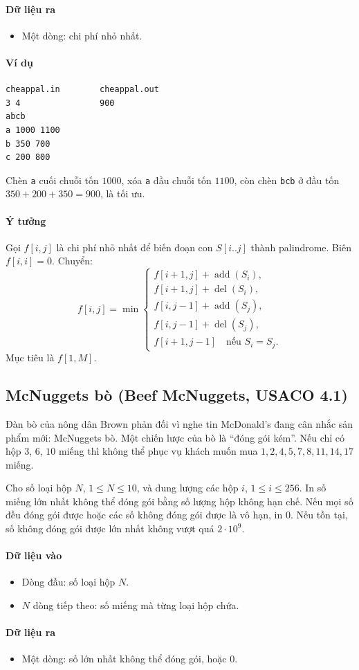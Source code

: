 \documentclass[11pt]{article}
\newcommand{\problem}[1]{\subsection{#1}}
\newcommand{\iosec}[1]{\paragraph{#1}}
\begin{document}
\iosec{Dữ liệu ra}
\begin{itemize}
  \item Một dòng: chi phí nhỏ nhất.
\end{itemize}

\iosec{Ví dụ}
\begin{verbatim}
cheappal.in        cheappal.out
3 4                900
abcb
a 1000 1100
b 350 700
c 200 800
\end{verbatim}

Chèn \texttt{a} cuối chuỗi tốn \(1000\), xóa \texttt{a} đầu chuỗi tốn \(1100\), còn chèn \texttt{bcb} ở đầu tốn \(350+200+350=900\), là tối ưu.

\iosec{Ý tưởng}
Gọi \(f[i,j]\) là chi phí nhỏ nhất để biến đoạn con \(S[i..j]\) thành palindrome. Biên \(f[i,i]=0\). Chuyển:
\[
f[i,j]=\min\begin{cases}
f[i+1,j]+\operatorname{add}(S_i),\\
f[i+1,j]+\operatorname{del}(S_i),\\
f[i,j-1]+\operatorname{add}(S_j),\\
f[i,j-1]+\operatorname{del}(S_j),\\
f[i+1,j-1]\quad\text{nếu }S_i=S_j.
\end{cases}
\]
Mục tiêu là \(f[1,M]\).

\problem{McNuggets bò (Beef McNuggets, USACO 4.1)}

Đàn bò của nông dân Brown phản đối vì nghe tin McDonald's đang cân nhắc sản phẩm mới: McNuggets bò. Một chiến lược của bò là ``đóng gói kém''. Nếu chỉ có hộp \(3\), \(6\), \(10\) miếng thì không thể phục vụ khách muốn mua \(1,2,4,5,7,8,11,14,17\) miếng.

Cho số loại hộp \(N\), \(1 \le N \le 10\), và dung lượng các hộp \(i\), \(1 \le i \le 256\). In số miếng lớn nhất không thể đóng gói bằng số lượng hộp không hạn chế. Nếu mọi số đều đóng gói được hoặc các số không đóng gói được là vô hạn, in \(0\). Nếu tồn tại, số không đóng gói được lớn nhất không vượt quá \(2\cdot 10^9\).

\iosec{Dữ liệu vào}
\begin{itemize}
  \item Dòng đầu: số loại hộp \(N\).
  \item \(N\) dòng tiếp theo: số miếng mà từng loại hộp chứa.
\end{itemize}

\iosec{Dữ liệu ra}
\begin{itemize}
  \item Một dòng: số lớn nhất không thể đóng gói, hoặc \(0\).
\end{itemize}
\end{document}
